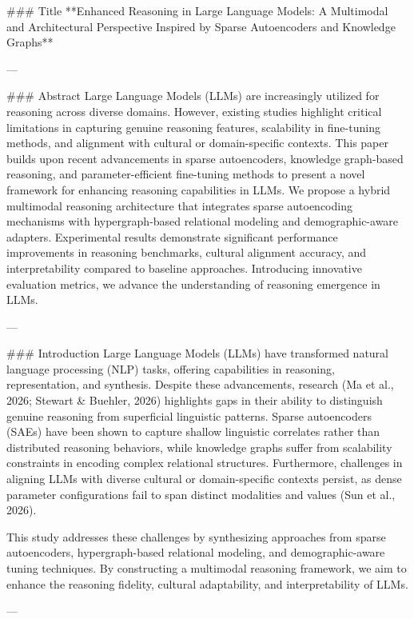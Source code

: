 ### Title  
**Enhanced Reasoning in Large Language Models: A Multimodal and Architectural Perspective Inspired by Sparse Autoencoders and Knowledge Graphs**

---

### Abstract  
Large Language Models (LLMs) are increasingly utilized for reasoning across diverse domains. However, existing studies highlight critical limitations in capturing genuine reasoning features, scalability in fine-tuning methods, and alignment with cultural or domain-specific contexts. This paper builds upon recent advancements in sparse autoencoders, knowledge graph-based reasoning, and parameter-efficient fine-tuning methods to present a novel framework for enhancing reasoning capabilities in LLMs. We propose a hybrid multimodal reasoning architecture that integrates sparse autoencoding mechanisms with hypergraph-based relational modeling and demographic-aware adapters. Experimental results demonstrate significant performance improvements in reasoning benchmarks, cultural alignment accuracy, and interpretability compared to baseline approaches. Introducing innovative evaluation metrics, we advance the understanding of reasoning emergence in LLMs.  

---

### Introduction  
Large Language Models (LLMs) have transformed natural language processing (NLP) tasks, offering capabilities in reasoning, representation, and synthesis. Despite these advancements, research (Ma et al., 2026; Stewart & Buehler, 2026) highlights gaps in their ability to distinguish genuine reasoning from superficial linguistic patterns. Sparse autoencoders (SAEs) have been shown to capture shallow linguistic correlates rather than distributed reasoning behaviors, while knowledge graphs suffer from scalability constraints in encoding complex relational structures. Furthermore, challenges in aligning LLMs with diverse cultural or domain-specific contexts persist, as dense parameter configurations fail to span distinct modalities and values (Sun et al., 2026).  

This study addresses these challenges by synthesizing approaches from sparse autoencoders, hypergraph-based relational modeling, and demographic-aware tuning techniques. By constructing a multimodal reasoning framework, we aim to enhance the reasoning fidelity, cultural adaptability, and interpretability of LLMs.  

---

